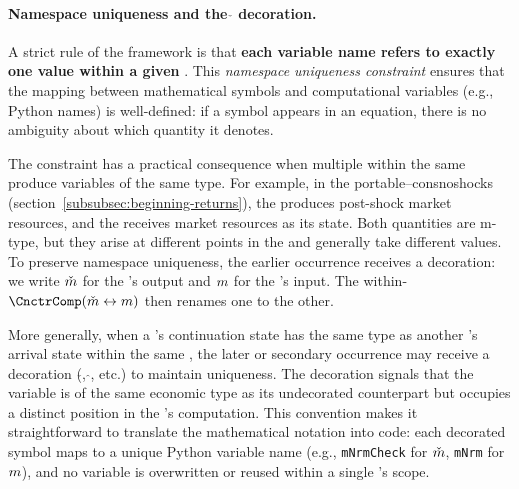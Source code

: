 \hypertarget{namespace-uniqueness}{}
\paragraph{Namespace uniqueness and the $\check{}$ decoration.}
A strict rule of the framework is that \textbf{each variable name refers
to exactly one value within a given {\interval}}. This
\textit{namespace uniqueness constraint} ensures that the mapping between
mathematical symbols and computational variables (e.g., Python names) is
well-defined: if a symbol appears in an equation, there is no ambiguity
about which quantity it denotes.

The constraint has a practical consequence when multiple {\stgs} within
the same {\interval} produce variables of the same type. For example,
in the portable--consnoshocks {\interval}
(section~\ref{subsubsec:beginning-returns}), the 
{\stg} produces post-shock market resources, and the
 {\stg} receives market resources as its
{\Arrival} state. Both quantities are m-type, but they arise at
different points in the {\interval} and generally take different values.
To preserve namespace uniqueness, the earlier occurrence receives a
decoration: we write $\check{m}$ for the  {\stg}'s
output and $m$ for the  {\stg}'s input.
The within-{\interval} {\Cnct}
$\CnctrComp(\check{\mNrm} \leftrightarrow \mNrm)$ then renames one to
the other.

More generally, when a {\stg}'s continuation state has the same type as
another {\stg}'s arrival state within the same {\interval}, the later or
secondary occurrence may receive a decoration ($\check{}$, $\hat{}$,
etc.) to maintain uniqueness. The decoration signals that the variable
is of the same economic type as its undecorated counterpart but occupies
a distinct position in the {\interval}'s computation. This convention
makes it straightforward to translate the mathematical notation into code:
each decorated symbol maps to a unique Python variable name (e.g.,
\texttt{mNrmCheck} for $\check{m}$, \texttt{mNrm} for $m$),
and no variable is overwritten or reused within a single {\interval}'s
scope.

